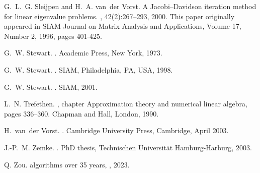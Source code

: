 \begin{thebibliography}{100}
	 G.~L.~G. Sleijpen and H.~A. van~der Vorst. \newblock A {Jacobi--Davidson}
	iteration method for linear eigenvalue problems. , 42(2):267--293, 2000. \newblock
	This paper originally appeared in SIAM Journal on Matrix Analysis and
	Applications, Volume 17, Number 2, 1996, pages 401-425.
	

	 G.~W. Stewart. . \newblock
    Academic Press, New York, 1973.

     G.~W. Stewart. .
    \newblock SIAM, Philadelphia, PA, USA, 1998.


	
	 G.~W. Stewart. . \newblock
	SIAM, 2001.
	
	
	 L.~N. Trefethen. , chapter
    Approximation theory
  and numerical linear algebra, pages 336--360.
\newblock Chapman and Hall, London, 1990.


	
	
 H.~van~der Vorst. .
\newblock Cambridge University Press, Cambridge, April 2003.
	
	
 J.-P.~M. Zemke. .
\newblock PhD thesis, Technischen Universität Hamburg-Harburg, 2003.
	
	
  Q. Zou.
 algorithms over 35 years,
   ,
 2023.
			

	
	
	\markboth{}{}
	
\end{thebibliography}

